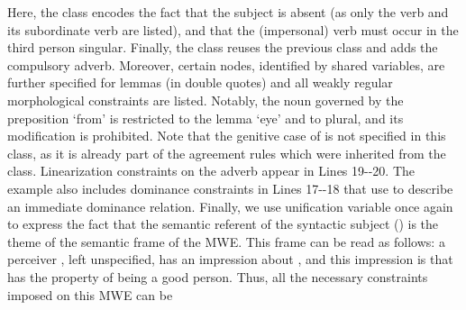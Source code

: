 \documentclass[output=paper
,modfonts
,nonflat
,biblatexbackend=biber
]{langsci/langscibook}
\begin{document}
{{{{{{Here\ili{},\ili{} the\ili{} \ili{}\texttt{}\ili{} class\ili{} encodes\ili{} the\ili{} fact\ili{} that\ili{} the\ili{} subject\ili{} is\ili{} absent\ili{} \ili{}(as\ili{} only\ili{} the\ili{} verb\ili{} \ili{}\isi{}\ili{} and\ili{} its\ili{} subordinate\ili{} verb\ili{} are\ili{} listed\ili{})\ili{},\ili{} and\ili{} that\ili{} the\ili{} \ili{}(impersonal\ili{})\ili{} verb\ili{} must\ili{} occur\ili{} in\ili{} the\ili{} third\ili{} person\ili{} singular\ili{}.\ili{} Finally\ili{},\ili{} the\ili{} \ili{}\texttt{}\ili{} class\ili{} reuses\ili{} the\ili{} previous\ili{} class\ili{} and\ili{} adds\ili{} the\ili{} compulsory\ili{} adverb\ili{}.\ili{} Moreover\ili{},\ili{} certain\ili{} \ili{} nodes\ili{},\ili{} identified\ili{} by\ili{} shared\ili{} variables\ili{},\ili{} are\ili{} further\ili{} specified\ili{} for\ili{} lemmas\ili{} \ili{}(in\ili{} double\ili{} quotes\ili{})\ili{} and\ili{} all\ili{} weakly\ili{} regular\ili{} morphological\ili{} constraints\ili{} are\ili{} listed\ili{}.\ili{} Notably\ili{},\ili{} the\ili{} noun\ili{} governed\ili{} by\ili{} the\ili{} preposition\ili{} \ili{}\textit{}\ili{} \ili{}`from\ili{}'\ili{} is\ili{} restricted\ili{} to\ili{} the\ili{} lemma\ili{} \ili{}\texttt{}\ili{} \ili{}`eye\ili{}'\ili{} and\ili{} to\ili{} plural\ili{},\ili{} and\ili{} its\ili{} modification\ili{} is\ili{} prohibited\ili{}.\ili{} Note\ili{} that\ili{} the\ili{} genitive\ili{} case\ili{} of\ili{} \ili{}\textit{}\ili{} is\ili{} not\ili{} specified\ili{} in\ili{} this\ili{} class\ili{},\ili{} as\ili{} it\ili{} is\ili{} already\ili{} part\ili{} of\ili{} the\ili{} agreement\ili{} rules\ili{} which\ili{} were\ili{} inherited\ili{} from\ili{} the\ili{} \ili{}\texttt{}\ili{} class\ili{}.\ili{} Linearization\ili{} constraints\ili{} on\ili{} the\ili{} adverb\ili{} appear\ili{} in\ili{} Lines\ili{} 19\ili{}-\ili{}-20\ili{}.\ili{} The\ili{} example\ili{} also\ili{} includes\ili{} dominance\ili{} constraints\ili{} in\ili{} Lines\ili{} 17\ili{}-\ili{}-18\ili{} that\ili{} use\ili{} \ili{}\texttt\ili{}{\ili{}-\ili{}>}\ili{} to\ili{} describe\ili{} an\ili{} immediate\ili{} dominance\ili{} relation\ili{}.\ili{} Finally\ili{},\ili{} we\ili{} use\ili{} unification\ili{} variable\ili{} once\ili{} again\ili{} to\ili{} express\ili{} the\ili{} fact\ili{} that\ili{} the\ili{} semantic\ili{} referent\ili{} of\ili{} the\ili{} syntactic\ili{} subject\ili{} \ili{}(\ili{}\texttt{}\ili{})\ili{} is\ili{} the\ili{} theme\ili{} of\ili{} the\ili{} semantic\ili{} frame\ili{} of\ili{} the\ili{} MWE\ili{}.\ili{} This\ili{} frame\ili{} can\ili{} be\ili{} read\ili{} as\ili{} follows\ili{}:\ili{} a\ili{} perceiver\ili{} \ili{}\texttt{}\ili{},\ili{} left\ili{} unspecified\ili{},\ili{} has\ili{} an\ili{} impression\ili{} about\ili{} \ili{}\texttt{}\ili{},\ili{} and\ili{} this\ili{} impression\ili{} is\ili{} that\ili{} \ili{}\texttt{}\ili{} has\ili{} the\ili{} property\ili{} of\ili{} being\ili{} a\ili{} good\ili{} person\ili{}.\ili{} Thus\ili{},\ili{} all\ili{} the\ili{} necessary\ili{} constraints\ili{} imposed\ili{} on\ili{} this\ili{} MWE\ili{} can\ili{} be\ili{} }}}}}}
\end{document}
